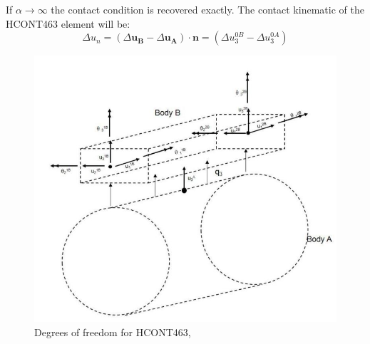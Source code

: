 If $\alpha \rightarrow \infty$ the contact condition is recovered exactly.\newline
\newline 
\noindent The contact kinematic of the HCONT463 element will be:
\begin{equation}
    \Delta u_n= (\Delta \boldsymbol{u_B} - \Delta \boldsymbol{u_A})  \cdot \boldsymbol{n} = (\Delta u_3^{0B} - \Delta u_3^{0A})
\end{equation}
\begin{figure}[H]
\centering
\includegraphics[scale=0.8]{figures/hcont463}
\caption[$\; \:$HCONT463]{Degrees of freedom for HCONT463,\cite{Bflextheory2013} }
 \label{fig:HCONT463}
\end{figure}

